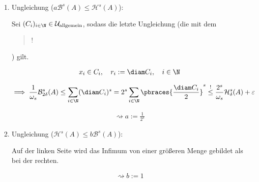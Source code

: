 \begin{solution}
\begin{enumerate}[label = \arabic*.]
    \begin{enumerate}[label = \arabic*.]

        \item Ungleichung ($a \mathcal{B}^s(A) \leq \mathcal{H}^s(A)$):
        
        Sei $(C_i)_{i \in \N} \in \mathcal{U}_\text{allgemein}$, sodass die letzte Ungleichung (die mit dem \blockquote{!}) gilt.

        \begin{align*}
            x_i \in C_i,
            \quad
            r_i := \diam C_i,
            \quad
            i \in \N
        \end{align*}

        \begin{align*}
            \implies
            \frac{1}{\omega_s}
            \mathcal{B}_{2 \delta}^s(A)
            \leq
            \sum_{i \in \N}
                (\diam C_i)^s
            =
            2^s
            \sum_{i \in \N}
                \pbraces
                {
                    \frac{\diam C_i}{2}
                }^s
            \stackrel{!}{\leq}
            \frac{2^s}{\omega_s}
            \mathcal{H}_\delta^s(A) + \varepsilon
        \end{align*}

        \begin{align*}
            \rightsquigarrow
            a := \frac{1}{2^s}
        \end{align*}

        \item Ungleichung ($\mathcal{H}^s(A) \leq b \mathcal{B}^s(A)$):
        
        Auf der linken Seite wird das Infimum von einer größeren Menge gebildet als bei der rechten.
    
        \begin{align*}
            \rightsquigarrow
            b := 1
        \end{align*}

    \end{enumerate}

\end{enumerate}

\end{solution}

